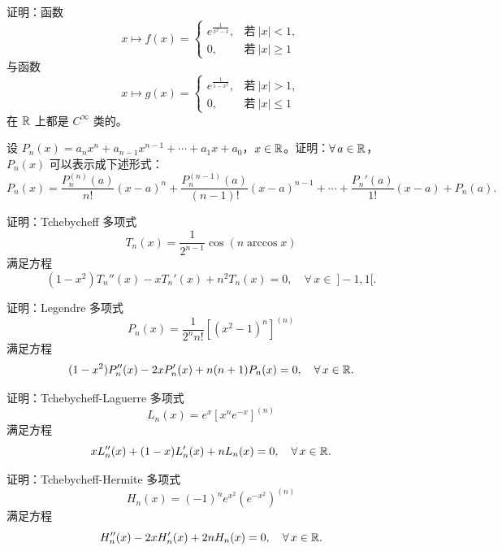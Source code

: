\begin{exercise}
	\item 证明：函数
	\[
	x\longmapsto f(x)=\begin{cases} e^{\frac1{x^2-1}}, & \text{若}\ |x|<1, \\ 0, & \text{若}\ |x|\ge1 \end{cases}
	\]
	与函数
	\[
	x\longmapsto g(x)=\begin{cases} e^{\frac1{1-x^2}}, & \text{若}\ |x|>1, \\ 0, & \text{若}\ |x|\le1 \end{cases}
	\]
	在 \(\mathbb{R}\) 上都是 \(C^\infty\) 类的。
\end{exercise}

\begin{exercise}
	\item 设 \(P_n(x)=a_nx^n+a_{n-1}x^{n-1}+\cdots+a_1x+a_0\)，\(x\in\mathbb{R}\)。证明：\(\forall\,a\in\mathbb{R}\)，\(P_n(x)\) 可以表示成下述形式：
	\[
	P_n(x)=\frac{P_n^{(n)}(a)}{n!}(x-a)^n+\frac{P_n^{(n-1)}(a)}{(n-1)!}(x-a)^{n-1}+\cdots+\frac{P_n'(a)}{1!}(x-a)+P_n(a).
	\]
\end{exercise}

\begin{exercise}
	\item 证明：Tchebycheff 多项式
	\[
	T_n(x)=\frac1{2^{n-1}}\cos(n\arccos x)
	\]
	满足方程
	\[
	(1-x^2)T_n''(x)-xT_n'(x)+n^2T_n(x)=0,\quad\forall\,x\in\ ]-1,1[.
	\]
\end{exercise}

\begin{exercise}
	\item 证明：Legendre 多项式
	\[
	P_n(x)=\frac1{2^n n!}\left[(x^2-1)^n\right]^{(n)}
	\]
	满足方程
	\[
	(1-x^2)P_n''(x)-2xP_n'(x)+n(n+1)P_n(x)=0,\quad\forall\,x\in\mathbb{R}.
	\]
\end{exercise}

\begin{exercise}
	\item 证明：Tchebycheff-Laguerre 多项式
	\[
	L_n(x)=e^x\left[x^n e^{-x}\right]^{(n)}
	\]
	满足方程
	\[
	xL_n''(x)+(1-x)L_n'(x)+nL_n(x)=0,\quad\forall\,x\in\mathbb{R}.
	\]
\end{exercise}

\begin{exercise}
	\item 证明：Tchebycheff-Hermite 多项式
	\[
	H_n(x)=(-1)^n e^{x^2}\left(e^{-x^2}\right)^{(n)}
	\]
	满足方程
	\[
	H_n''(x)-2xH_n'(x)+2nH_n(x)=0,\quad\forall\,x\in\mathbb{R}.
	\]
\end{exercise}

